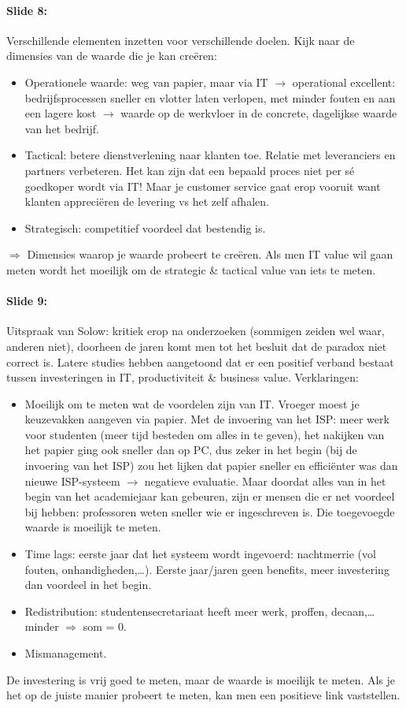 \documentclass[10pt,a4paper]{report}
\begin{document}
\paragraph{Slide 8:}Verschillende elementen inzetten voor verschillende doelen. Kijk naar de dimensies van de waarde die je kan creëren:
\begin{itemize}
\item Operationele waarde: weg van papier, maar via IT $\rightarrow$ operational excellent: bedrijfsprocessen sneller en vlotter laten verlopen, met minder fouten en aan een lagere kost $\rightarrow$ waarde op de werkvloer in de concrete, dagelijkse waarde van het bedrijf.
\item Tactical: betere dienstverlening naar klanten toe. Relatie met leveranciers en partners verbeteren. Het kan zijn dat een bepaald proces niet per s\'e goedkoper wordt via IT! Maar je customer service gaat erop vooruit want klanten appreciëren de levering vs het zelf afhalen.
\item Strategisch: competitief voordeel dat bestendig is.
\end{itemize}
$\Rightarrow$ Dimensies waarop je waarde probeert te creëren. Als men IT value wil gaan meten wordt het moeilijk om de strategic \& tactical value van iets te meten.

\paragraph{Slide 9:}Uitspraak van Solow: kritiek erop na onderzoeken (sommigen zeiden wel waar, anderen niet), doorheen de jaren komt men tot het besluit dat de paradox niet correct is. Latere studies hebben aangetoond dat er een positief verband bestaat tussen investeringen in IT, productiviteit \& business value. Verklaringen:
\begin{itemize}
\item Moeilijk om te meten wat de voordelen zijn van IT. Vroeger moest je keuzevakken aangeven via papier. Met de invoering van het ISP: meer werk voor studenten (meer tijd besteden om alles in te geven), het nakijken van het papier ging ook sneller dan op PC, dus zeker in het begin (bij de invoering van het ISP) zou het lijken dat papier sneller en efficiënter was dan nieuwe ISP-systeem $\rightarrow$ negatieve evaluatie. Maar doordat alles van in het begin van het academiejaar kan gebeuren, zijn er mensen die er net voordeel bij hebben: professoren weten sneller wie er ingeschreven is. Die toegevoegde waarde is moeilijk te meten.
\item Time lags: eerste jaar dat het systeem wordt ingevoerd: nachtmerrie (vol fouten, onhandigheden,…). Eerste jaar/jaren geen benefits, meer investering dan voordeel in het begin.
\item Redistribution: studentensecretariaat heeft meer werk, proffen, decaan,… minder $\Rightarrow$ som = 0.
\item Mismanagement.
\end{itemize}
De investering is vrij goed te meten, maar de waarde is moeilijk te meten. Als je het op de juiste manier probeert te meten, kan men een positieve link vaststellen.
\end{document}
